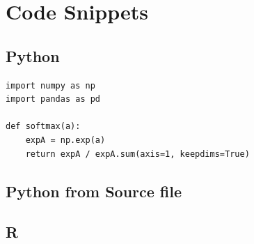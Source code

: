 \documentclass[10pt,a4paper]{article}
\begin{document}
\newpage
\section*{Code Snippets}
\subsection*{Python}
\begin{lstlisting}
import numpy as np
import pandas as pd

def softmax(a):
    expA = np.exp(a)
    return expA / expA.sum(axis=1, keepdims=True)
\end{lstlisting}

\subsection*{Python from Source file}
 	 
  
\subsection*{R}
	
  
\end{document}
